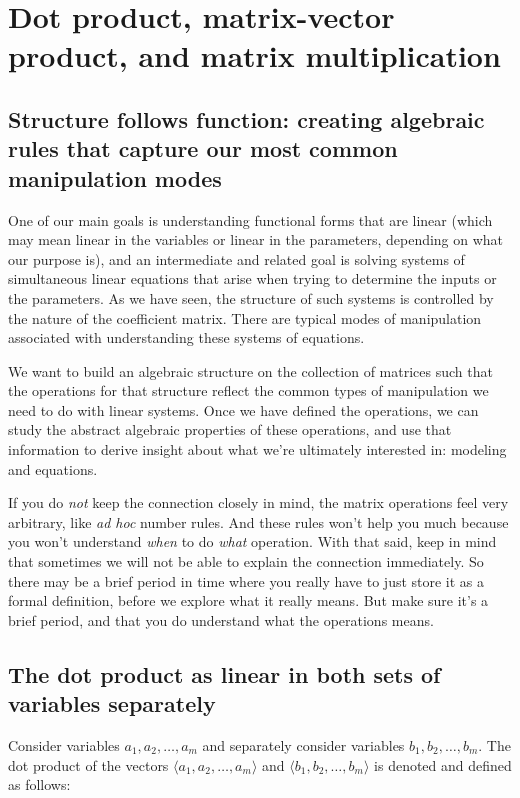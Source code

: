 \documentclass[10pt]{amsart}
\begin{document}
\section{Dot product, matrix-vector product, and matrix multiplication}

\subsection{Structure follows function: creating algebraic rules that capture our most common manipulation modes}

One of our main goals is understanding functional forms that are
linear (which may mean linear in the variables or linear in the
parameters, depending on what our purpose is), and an intermediate and
related goal is solving systems of simultaneous linear equations that
arise when trying to determine the inputs or the parameters. As we
have seen, the structure of such systems is controlled by the nature
of the coefficient matrix. There are typical modes of manipulation
associated with understanding these systems of equations.

We want to build an algebraic structure on the collection of matrices
such that the operations for that structure reflect the common types
of manipulation we need to do with linear systems. Once we have
defined the operations, we can study the abstract algebraic properties
of these operations, and use that information to derive insight about
what we're ultimately interested in: modeling and equations.

If you do {\em not} keep the connection closely in mind, the matrix
operations feel very arbitrary, like {\em ad hoc} number rules. And
these rules won't help you much because you won't understand {\em
  when} to do {\em what} operation. With that said, keep in mind that
sometimes we will not be able to explain the connection
immediately. So there may be a brief period in time where you really
have to just store it as a formal definition, before we explore what
it really means. But make sure it's a brief period, and that you do
understand what the operations means.

\subsection{The dot product as linear in both sets of variables separately}

Consider variables $a_1,a_2,\dots,a_m$ and separately consider
variables $b_1,b_2,\dots,b_m$. The dot product of the vectors $\langle
a_1,a_2,\dots,a_m \rangle$ and $\langle b_1,b_2,\dots,b_m \rangle$ is
denoted and defined as follows:
\end{document}

